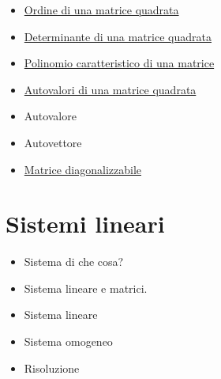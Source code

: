 \documentclass[a4paper,10pt]{article}
\begin{document}
\begin{itemize}
   \item \href{OrdineMatrice.html}{Ordine di una matrice quadrata}
   \item \href{DeterminanteMatrice.html}{Determinante di una matrice quadrata}
   \item \href{PolinomioMatrice.html}{Polinomio caratteristico di una matrice}
   \item \href{AutovaloriMatrice.html}{Autovalori di una matrice quadrata}
   \item Autovalore
   \item Autovettore
   \item \href{MatriceDiagonalizzabile.html}{Matrice diagonalizzabile}
\end{itemize}

\section{Sistemi lineari}
  \begin{itemize}
   \item Sistema di che cosa?
   \item Sistema lineare e matrici.
   \item Sistema lineare
   \item Sistema omogeneo
   \item Risoluzione
  \end{itemize}
\end{document}
